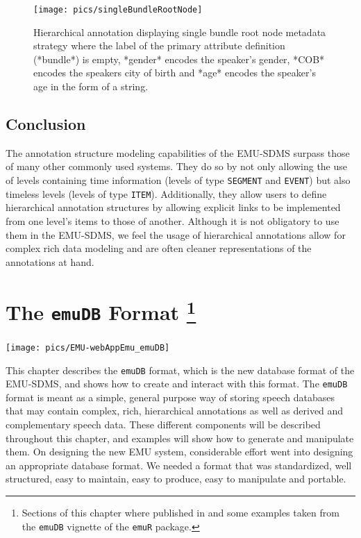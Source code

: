 \documentclass[]{book}
\begin{document}
\begin{figure}

{\centering \texttt{[image: pics/singleBundleRootNode]} 

}

\caption{Hierarchical annotation displaying single bundle root node metadata strategy where the label of the primary attribute definition (*bundle*) is empty, *gender* encodes the speaker's gender, *COB* encodes the speakers city of birth and *age* encodes the speaker's age in the form of a string.}\label{fig:singleBundleRootNode}
\end{figure}

\hypertarget{conclusion-1}{%
\section{Conclusion}\label{conclusion-1}}

The annotation structure modeling capabilities of the EMU-SDMS surpass those of many other commonly used systems. They do so by not only allowing the use of levels containing time information (levels of type \texttt{SEGMENT} and \texttt{EVENT}) but also timeless levels (levels of type \texttt{ITEM}). Additionally, they allow users to define hierarchical annotation structures by allowing explicit links to be implemented from one level's items to those of another. Although it is not obligatory to use them in the EMU-SDMS, we feel the usage of hierarchical annotations allow for complex rich data modeling and are often cleaner representations of the annotations at hand.

\hypertarget{chap:emuDB}{%
\chapter[The \texttt{emuDB} Format ]{\texorpdfstring{The \texttt{emuDB} Format \footnote{Sections of this chapter where published in \citet{winkelmann:2017aa} and some examples taken from the \texttt{emuDB} vignette of the \texttt{emuR} package.}}{The emuDB Format }}\label{chap:emuDB}}

\begin{center}\texttt{[image: pics/EMU-webAppEmu\_emuDB]} \end{center}

This chapter describes the \texttt{emuDB} format, which is the new database format of the EMU-SDMS, and shows how to create and interact with this format. The \texttt{emuDB} format is meant as a simple, general purpose way of storing speech databases that may contain complex, rich, hierarchical annotations as well as derived and complementary speech data. These different components will be described throughout this chapter, and examples will show how to generate and manipulate them. On designing the new EMU system, considerable effort went into designing an appropriate database format. We needed a format that was standardized, well structured, easy to maintain, easy to produce, easy to manipulate and portable.
\end{document}
